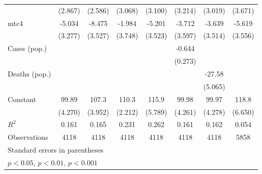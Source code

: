 \documentclass{article}
\begin{document}
{\begin{longtable}{l*{7}{c}}
                &  (2.867)         &  (2.586)         &  (3.068)         &  (3.100)         &  (3.214)         &  (3.019)         &  (3.671)         \\
mtc4            &   -5.034         &   -8.475\sym{*}  &   -1.984         &   -5.201         &   -3.712         &   -3.639         &   -5.619         \\
                &  (3.277)         &  (3.527)         &  (3.748)         &  (3.523)         &  (3.597)         &  (3.514)         &  (3.556)         \\
Cases (pop.)    &                  &                  &                  &                  &   -0.644\sym{*}  &                  &                  \\
                &                  &                  &                  &                  &  (0.273)         &                  &                  \\
Deaths (pop.)   &                  &                  &                  &                  &                  &   -27.58\sym{***}&                  \\
                &                  &                  &                  &                  &                  &  (5.065)         &                  \\
Constant        &    99.89\sym{***}&    107.3\sym{***}&    110.3\sym{***}&    115.9\sym{***}&    99.98\sym{***}&    99.97\sym{***}&    118.8\sym{***}\\
                &  (4.270)         &  (3.952)         &  (2.212)         &  (5.789)         &  (4.261)         &  (4.278)         &  (6.650)         \\
\hline
\(R^{2}\)       &    0.161         &    0.165         &    0.231         &    0.262         &    0.161         &    0.162         &    0.054         \\
Observations    &     4118         &     4118         &     4118         &     4118         &     4118         &     4118         &     5858         \\
\hline\hline
\multicolumn{8}{l}{\footnotesize Standard errors in parentheses}\\
\multicolumn{8}{l}{\footnotesize \sym{*} \(p<0.05\), \sym{**} \(p<0.01\), \sym{***} \(p<0.001\)}\\
\end{longtable}
}
\end{document}
